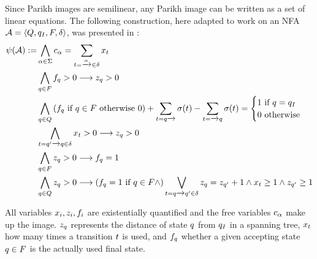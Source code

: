 \documentclass[acmsmall,review,anonymous,screen]{acmart}\settopmatter{printfolios=true,printccs=true,printacmref=true}
\theoremstyle{definition}
\begin{document}
Since Parikh images are semilinear, any Parikh image can be written as a set of linear
equations. The following construction, here adapted to work on an NFA $\mathcal{A} = \left\langle Q, q_I, F, \delta\right\rangle$, was presented in \cite{generate-parikh-image}:
\begin{equation}
\begin{aligned}
\ParikhMap(\Automaton) := 
& \AndComp{\Letter \in \Alphabet}{\LetterVar_{\Letter} = \sum_{\Transition = \FromLabelTo{}{\Letter}{} \in \Transitions} \TransitionVar_{\Transition}
}\\
& \AndComp{\State \in \AcceptingStates}{\FinalStateVar_{\State} > 0 \longrightarrow  \StateVar_{\State} > 0}\\
& \AndComp{\State \in \States}{
  \left(\FinalStateVar_{\State} \text{ if } \State \in \AcceptingStates \text{ otherwise } 0 \right) +
  \sum_{\Transition = \FromLabelTo{\State}{}{}} \Filter(\Transition) - \sum_{\Transition = \FromLabelTo{}{}{\State}} \Filter(\Transition)
= \begin{cases}
    1 \text{  if $\State = \InitialState$} \\
    0 \text{ otherwise}
  \end{cases}
}\\
& \AndComp{\Transition = \FromLabelTo{\State'}{}{\State} \in \Transitions}{
  \TransitionVar_{\Transition} > 0 \longrightarrow \StateVar_{\State} > 0
} \\
& \AndComp{\State \in F}{
  \StateVar_{\State} > 0 \longrightarrow \FinalStateVar_{\State} = 1
} \\
&\AndComp{\State \in \States}{
  \StateVar_{\State} > 0 \longrightarrow
  \left(\FinalStateVar_{\State} = 1 \text{ if } \State \in \AcceptingStates \land \right) \OrComp{\Transition = \FromLabelTo{\State}{}{\State'} \in \Transitions}{
    \StateVar_{\State} = \StateVar_{\State'} + 1 \land 
    \TransitionVar_{\Transition} \geq 1 \land
  \StateVar_{\State'} \geq 1
    }
}
\end{aligned}
\label{eq:generate-parikh}
\end{equation}

All variables $x_i, z_i, f_i$ are
existentially quantified and the free variables $c_\alpha$ make up the
image. $z_q$ represents the distance of state $q$ from
$q_I$ in a spanning tree, $x_t$ how many times
a transition $t$ is used, and $f_q$ whether a given
accepting state $q \in F$ is the actually used final state.
\end{document}
